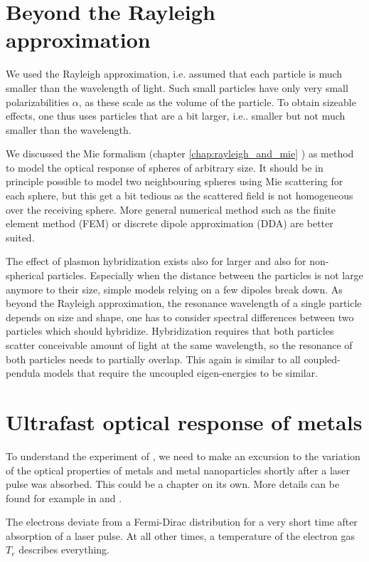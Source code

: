 \section{Beyond the Rayleigh approximation}

We used the Rayleigh approximation, i.e. assumed that each particle is much smaller than the wavelength of light. Such small particles have only very small polarizabilities $\alpha$, as these scale as the volume of the particle. To obtain sizeable effects, one thus uses particles that are a bit larger, i.e.. smaller but not much smaller than the wavelength. 

We discussed the Mie formalism (chapter \ref{chap:rayleigh_and_mie}
) as method to model the optical response of spheres of arbitrary size. It should be in principle possible to model two neighbouring spheres using Mie scattering for each sphere, but this get a bit tedious as the scattered field is not homogeneous over the receiving sphere. More general numerical method such as the finite element method (FEM) or discrete dipole approximation (DDA) are better suited.

The effect of plasmon hybridization exists also for larger and also for non-spherical particles. Especially when the distance between the particles is not large anymore to their size, simple models relying on a few dipoles break down. As beyond the Rayleigh approximation, the resonance wavelength of a single particle depends on size and shape, one has to consider spectral differences between two particles which should hybridize. Hybridization requires that both particles scatter conceivable amount of light at the same wavelength, so the resonance of both particles needs to partially overlap. This again is similar to all coupled-pendula models that require the uncoupled eigen-energies to be similar.




\section{Ultrafast optical response of metals}


To understand the experiment of \cite{Schumacher11}, we need to make an excursion to the variation of the optical properties of metals and metal nanoparticles shortly after a laser pulse was absorbed. This could be a chapter on its own. More details can be found for example in \cite{Block19} and  \cite{Crut17}.


\begin{marginfigure}
\caption{The electrons deviate from a  Fermi-Dirac distribution for a very short time after absorption of a laser pulse. At all other times, a temperature of the electron gas $T_e$ describes everything.}
\end{marginfigure}


